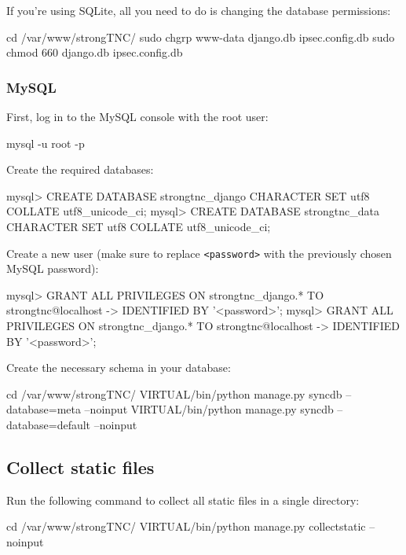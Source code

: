 If you're using SQLite, all you need to do is changing the database permissions:

\begin{bashcode}
cd /var/www/strongTNC/
sudo chgrp www-data django.db ipsec.config.db
sudo chmod 660 django.db ipsec.config.db
\end{bashcode}

\subsubsection*{MySQL}

First, log in to the MySQL console with the root user:

\begin{bashcode}
mysql -u root -p
\end{bashcode}

Create the required databases:

\begin{sqlcode}
mysql> CREATE DATABASE strongtnc_django CHARACTER SET utf8 COLLATE utf8_unicode_ci;
mysql> CREATE DATABASE strongtnc_data CHARACTER SET utf8 COLLATE utf8_unicode_ci;
\end{sqlcode}

Create a new user (make sure to replace \texttt{<password>} with the previously
chosen MySQL password):

\begin{sqlcode}
mysql> GRANT ALL PRIVILEGES ON strongtnc_django.* TO strongtnc@localhost
-> IDENTIFIED BY '<password>';
mysql> GRANT ALL PRIVILEGES ON strongtnc_django.* TO strongtnc@localhost
-> IDENTIFIED BY '<password>';
\end{sqlcode}

Create the necessary schema in your database:

\begin{bashcode}
cd /var/www/strongTNC/
VIRTUAL/bin/python manage.py syncdb --database=meta --noinput
VIRTUAL/bin/python manage.py syncdb --database=default --noinput
\end{bashcode}

\subsection*{Collect static files}

Run the following command to collect all static files in a single directory:

\begin{bashcode}
cd /var/www/strongTNC/
VIRTUAL/bin/python manage.py collectstatic --noinput
\end{bashcode}

